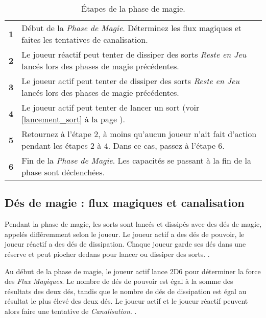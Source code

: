\begin{table}[!htbp]
\centering
\begin{tabular}{c|m{12cm}}
\textbf{1} & Début de la \emph{Phase de Magie}. Déterminez les flux magiques et faites les tentatives de canalisation. \tabularnewline
\textbf{2} & Le joueur réactif peut tenter de dissiper des sorts \emph{Reste en Jeu} lancés lors des phases de magie précédentes. \tabularnewline
\textbf{3} & Le joueur actif peut tenter de dissiper des sorts \emph{Reste en Jeu} lancés lors des phases de magie précédentes. \tabularnewline
\textbf{4} & Le joueur actif peut tenter de lancer un sort (voir \ref{lancement_sort} à la page \pageref{lancement_sort}). \tabularnewline
\textbf{5} & Retournez à l'étape 2, à moins qu'aucun joueur n'ait fait d'action pendant les étapes 2 à 4. Dans ce cas, passez à l'étape 6. \tabularnewline
\textbf{6} & Fin de la \emph{Phase de Magie}. Les capacités se passant à la fin de la phase sont déclenchées. \tabularnewline
\end{tabular}
\caption{\label{table/etapes_magie}Étapes de la phase de magie.}
\end{table}

\subsection{Dés de magie : flux magiques et canalisation}

Pendant la phase de magie, les sorts sont lancés et dissipés avec des dés de magie, appelés différemment selon le joueur. Le joueur actif a des dés de pouvoir, le joueur réactif a des dés de dissipation. Chaque joueur garde ses dés dans une réserve et peut piocher dedans pour lancer ou dissiper des sorts. .

Au début de la phase de magie, le joueur actif lance 2D6 pour déterminer la force des \emph{Flux Magiques}. Le nombre de dés de pouvoir est égal à la somme des résultats des deux dés, tandis que le nombre de dés de dissipation est égal au résultat le plus élevé des deux dés. Le joueur actif et le joueur réactif peuvent alors faire une tentative de \emph{Canalisation}. .

